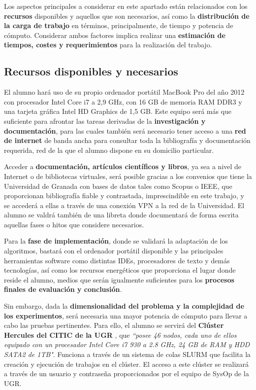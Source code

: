 Los aspectos principales a considerar en este apartado están relacionados con los \textbf{recursos} disponibles y aquellos que son necesarios, así como la \textbf{distribución de la carga de trabajo} en términos, principalmente, de tiempo y potencia de cómputo. Considerar ambos factores implica realizar una \textbf{estimación de tiempos, costes y requerimientos} para la realización del trabajo.

\subsection{Recursos disponibles y necesarios}

El alumno hará uso de su propio ordenador portátil MacBook Pro del año 2012 con procesador Intel Core i7 a 2,9 GHz, con 16 GB de memoria RAM DDR3 y una tarjeta gráfica Intel HD Graphics de 1,5 GB. Este equipo será más que suficiente para afrontar las tareas derivadas de la \textbf{investigación y documentación}, para las cuales también será necesario tener acceso a una \textbf{red de internet} de banda ancha para consultar toda la bibliografía y documentación requerida, red de la que el alumno dispone en su domicilio particular.

Acceder a \textbf{documentación, artículos científicos y libros}, ya sea a nivel de Internet o de bibliotecas virtuales, será posible gracias a los convenios que tiene la Universidad de Granada con bases de datos tales como Scopus\cite{SCOPUS} o IEEE, que proporcionan bibliografía fiable y contrastada, imprescindible en este trabajo, y se accederá a ellas a través de una conexión VPN a la red de la Universidad. El alumno se valdrá también de una libreta donde documentará de forma escrita aquellas fases o hitos que considere necesarios.

Para la \textbf{fase de implementación}, donde se validará la adaptación de los algoritmos, bastará con el ordenador portátil disponible y las principales herramientas software como distintas IDEs, procesadores de texto y demás tecnologías, así como los recursos energéticos que proporciona el lugar donde reside el alumno, medios que serán igualmente suficientes para los \textbf{procesos finales de evaluación y conclusión}. 

Sin embargo, dada la \textbf{dimensionalidad del problema y la complejidad de los experimentos}, será necesaria una mayor potencia de cómputo para llevar a cabo las pruebas pertinentes. Para ello, el alumno se servirá del \textbf{Clúster Hercules del CITIC de la UGR} \cite{HERCULES}, que \textit{``posee 46 nodos, cada uno de ellos equipado con un procesador Intel Core i7 930 a 2.8 GHz, 24 GB de RAM y HDD SATA2 de 1TB"}. Funciona a través de un sistema de colas SLURM\cite{SLURM} que facilita la creación y ejecución de trabajos en el clúster. El acceso a este clúster se realizará a través de un usuario y contraseña proporcionados por el equipo de SysOp de la UGR.

